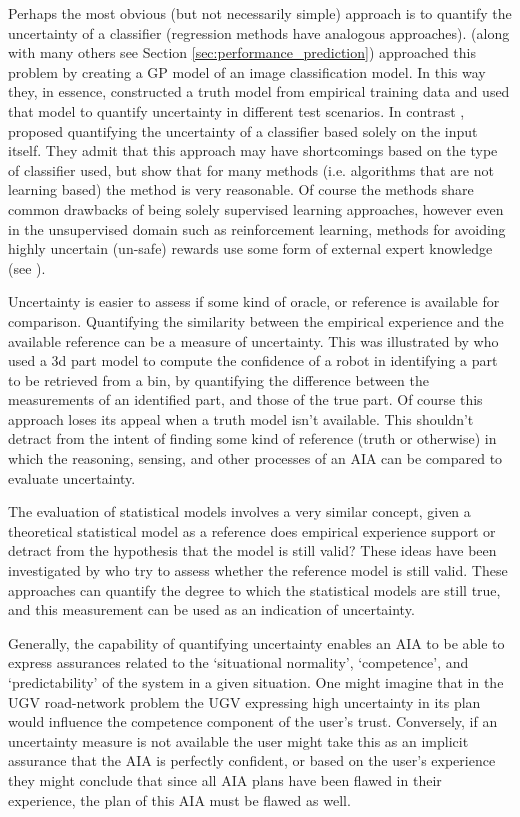     Perhaps the most obvious (but not necessarily simple) approach is to quantify the uncertainty of a classifier (regression methods have analogous approaches). \cite{Gurau2016-hs} (along with many others see Section \ref{sec:performance_prediction}) approached this problem by creating a GP model of an image classification model. In this way they, in essence, constructed a truth model from empirical training data and used that model to quantify uncertainty in different test scenarios. In contrast , \cite{Zhang2014-he} proposed quantifying the uncertainty of a classifier based solely on the input itself. They admit that this approach may have shortcomings based on the type of classifier used, but show that for many methods (i.e. algorithms that are not learning based) the method is very reasonable. Of course the methods share common drawbacks of being solely supervised learning approaches, however even in the unsupervised domain such as reinforcement learning, methods for avoiding highly uncertain (un-safe) rewards use some form of external expert knowledge (see \cite{Garcia2015-rs, Lipton2016-dq}).

    Uncertainty is easier to assess if some kind of oracle, or reference is available for comparison. Quantifying the similarity between the empirical experience and the available reference can be a measure of uncertainty. This was illustrated by \cite{Kaipa2015-hy} who used a 3d part model to compute the confidence of a robot in identifying a part to be retrieved from a bin, by quantifying the difference between the measurements of an identified part, and those of the true part. Of course this approach loses its appeal when a truth model isn't available. This shouldn't detract from the intent of finding some kind of reference (truth or otherwise) in which the reasoning, sensing, and other processes of an AIA can be compared to evaluate uncertainty.

    The evaluation of statistical models involves a very similar concept, given a theoretical statistical model as a reference does empirical experience support or detract from the hypothesis that the model is still valid? These ideas have been investigated by \cite{Laskey1991-mf, Laskey1995-jp, Laskey2015-gz, Zagorecki2015-qy, Habbema1976-xd, Ghosh2016-dl} who try to assess whether the reference model is still valid. These approaches can quantify the degree to which the statistical models are still true, and this measurement can be used as an indication of uncertainty.

    Generally, the capability of quantifying uncertainty enables an AIA to be able to express assurances related to the `situational normality', `competence', and `predictability' of the system in a given situation. One might imagine that in the UGV road-network problem the UGV expressing high uncertainty in its plan would influence the competence component of the user's trust. Conversely, if an uncertainty measure is not available the user might take this as an implicit assurance that the AIA is perfectly confident, or based on the user's experience they might conclude that since all AIA plans have been flawed in their experience, the plan of this AIA must be flawed as well.

